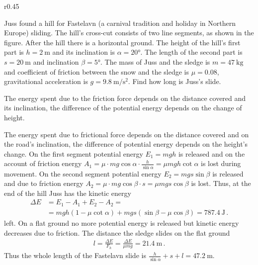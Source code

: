 \begin{wrapfigure}[5]{r}{0.45\linewidth}
	\vspace{-5pt}
\end{wrapfigure}
Juss found a hill for Fastelavn (a carnival tradition and holiday in Northern Europe) sliding. The hill’s cross-cut consists of two line segments, as shown in the figure. After the hill there is a horizontal ground. The height of the hill’s first part is \(h=\SI{2}{\meter}\) and its inclination is \(\alpha=\ang{20}\). The length of the second part is \(s=\SI{20}{\meter}\) and inclination \(\beta=\ang{5}\). The mass of Juss and the sledge is \(m=\SI{47}{\kilogram}\) and coefficient of friction between the snow and the sledge is \(\mu=\num{0.08}\), gravitational acceleration is \(g=\SI{9.8}{\meter\per\second\squared}\). Find how long is Juss’s slide.

\hinteng
The energy spent due to the friction force depends on the distance covered and its inclination, the difference of the potential energy depends on the change of height.

\solueng
The energy spent due to frictional force depends on the distance covered and on the road’s inclination, the difference of potential energy depends on the height’s change. On the first segment potential energy \(E_1 = mgh\) is released and on the account of friction energy \( A_1 = \mu \cdot mg\cos\alpha \cdot \frac{h}{\sin\alpha} = \mu mgh \cot\alpha \) is lost during movement. On the second segment potential energy \(E_2 = mgs \sin\beta\) is released and due to friction energy \( A_2 = \mu \cdot mg \cos \beta \cdot s = \mu mgs \cos \beta \) is lost. Thus, at the end of the hill Juss has the kinetic energy
\begin{align*}
\Delta E &= E_1 - A_1 + E_2 - A_2 = \\
&= mgh(1-\mu\cot\alpha) + mgs(\sin\beta - \mu\cos\beta) =  \SI{787.4}{\joule} \, .
\end{align*} 
left. On a flat ground no more potential energy is released but kinetic energy decreases due to friction. The distance the sledge slides on the flat ground
\begin{align*}
l = \frac{\Delta E}{F_h} = \frac{\Delta E}{\mu mg} = \SI{21.4}{\meter} \, .
\end{align*} 
Thus the whole length of the Fastelavn slide is \(\frac{h}{\sin\alpha} + s + l = \SI{47.2}{\meter}\).
\probend